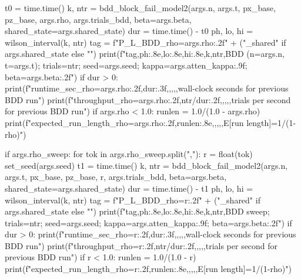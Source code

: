 {{{{        t0 = time.time()
        k, ntr = bdd_block_fail_model2(args.n, args.t, px_base, pz_base, args.rho, args.trials_bdd,
                                       beta=args.beta, shared_state=args.shared_state)
        dur = time.time() - t0
        ph, lo, hi = wilson_interval(k, ntr)
        tag = f"P_L_BDD_rho={args.rho:.2f}" + ("_shared" if args.shared_state else "")
        print(f"{tag},{ph:.8e},{lo:.8e},{hi:.8e},{k},{ntr},BDD (n={args.n}, t={args.t}); trials={ntr}; seed={args.seed}; kappa={args.atten_kappa:.9f}; beta={args.beta:.2f}")
        if dur > 0:
            print(f"runtime_sec_rho={args.rho:.2f},{dur:.3f},,,,,wall-clock seconds for previous BDD run")
            print(f"throughput_rho={args.rho:.2f},{ntr/dur:.2f},,,,,trials per second for previous BDD run")
        if args.rho < 1.0:
            runlen = 1.0/(1.0 - args.rho)
            print(f"expected_run_length_rho={args.rho:.2f},{runlen:.8e},,,,,E[run length]=1/(1-rho)")

        if args.rho_sweep:
            for tok in args.rho_sweep.split(","):
                r = float(tok)
                set_seed(args.seed)
                t1 = time.time()
                k, ntr = bdd_block_fail_model2(args.n, args.t, px_base, pz_base, r, args.trials_bdd,
                                               beta=args.beta, shared_state=args.shared_state)
                dur = time.time() - t1
                ph, lo, hi = wilson_interval(k, ntr)
                tag = f"P_L_BDD_rho={r:.2f}" + ("_shared" if args.shared_state else "")
                print(f"{tag},{ph:.8e},{lo:.8e},{hi:.8e},{k},{ntr},BDD sweep; trials={ntr}; seed={args.seed}; kappa={args.atten_kappa:.9f}; beta={args.beta:.2f}")
                if dur > 0:
                    print(f"runtime_sec_rho={r:.2f},{dur:.3f},,,,,wall-clock seconds for previous BDD run")
                    print(f"throughput_rho={r:.2f},{ntr/dur:.2f},,,,,trials per second for previous BDD run")
                if r < 1.0:
                    runlen = 1.0/(1.0 - r)
                    print(f"expected_run_length_rho={r:.2f},{runlen:.8e},,,,,E[run length]=1/(1-rho)")

}}}}
